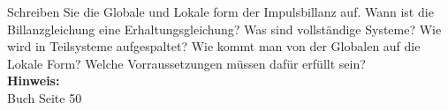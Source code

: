 \begin{question}[section=2,subsection=23,name={Impulsbillanz},difficulty=5,type=mdl,mode=exm,tags={20161207}]
	Schreiben Sie die Globale und Lokale form der Impulsbillanz auf. Wann ist die Billanzgleichung eine Erhaltungsgleichung? Was sind vollständige Systeme? Wie wird in Teilsysteme aufgespaltet? Wie kommt man von der Globalen auf die Lokale Form? Welche Vorraussetzungen müssen dafür erfüllt sein? 
	\\ \textbf{Hinweis:}\\
	Buch Seite 50
\end{question}
\begin{solution}
	
\end{solution}